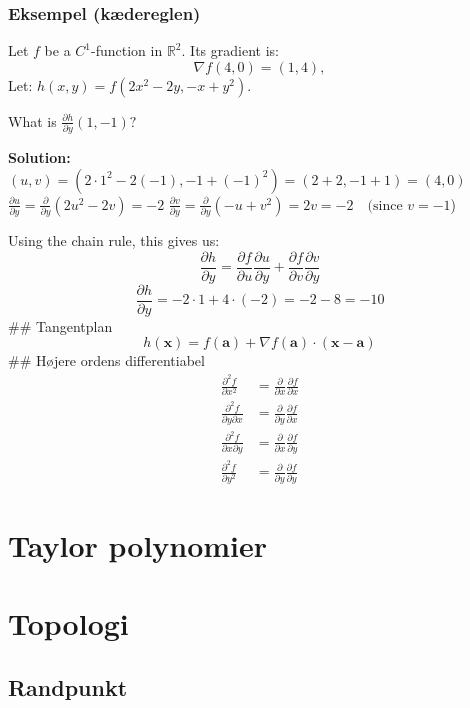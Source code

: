 \hypertarget{eksempel-kuxe6dereglen}{%
\subsubsection{Eksempel (kædereglen)}\label{eksempel-kuxe6dereglen}}

Let \(f\) be a \(C^1\)-function in \(\mathbb{R}^2\). Its gradient is: \[
\nabla f(4,0)=(1,4),
\] Let: \(h(x, y)=f\left(2 x^2-2 y,-x+y^2\right)\).

What is \(\frac{\partial h}{\partial y}(1,-1) ?\)

\textbf{Solution:}
\((u,v)=(2\cdot1^2-2(-1),-1+(-1)^2)=(2+2,-1+1)=(4,0)\)
\(\frac{\partial u}{\partial y}=\frac{\partial}{\partial y}(2u^2-2v)=-2\)
\(\frac{\partial v}{\partial y}=\frac{\partial}{\partial y}(-u+v^2)=2v=-2\quad (\text{since } v=-1\))

Using the chain rule, this gives us: \[
\frac{\partial h}{\partial y}=\frac{\partial f}{\partial u}\frac{\partial u}{\partial y}+\frac{\partial f}{\partial v}\frac{\partial v}{\partial y}
\] \[
\frac{\partial h}{\partial y}= -2\cdot1+4\cdot(-2)=-2-8=-10
\] \#\# Tangentplan \[
h(\mathbf{x})=f(\mathbf{a})+\nabla f(\mathbf{a}) \cdot(\mathbf{x}-\mathbf{a})
\] \#\# Højere ordens differentiabel \[
\begin{aligned}
\frac{\partial^2 f}{\partial x^2} & =\frac{\partial}{\partial x} \frac{\partial f}{\partial x} \\
\frac{\partial^2 f}{\partial y \partial x} & =\frac{\partial}{\partial y} \frac{\partial f}{\partial x} \\
\frac{\partial^2 f}{\partial x \partial y} & =\frac{\partial}{\partial x} \frac{\partial f}{\partial y} \\
\frac{\partial^2 f}{\partial y^2} & =\frac{\partial}{\partial y} \frac{\partial f}{\partial y}
\end{aligned}
\]

\hypertarget{taylor-polynomier}{%
\section{Taylor polynomier}\label{taylor-polynomier}}

\hypertarget{topologi}{%
\section{Topologi}\label{topologi}}

\hypertarget{randpunkt}{%
\subsection{Randpunkt}\label{randpunkt}}

